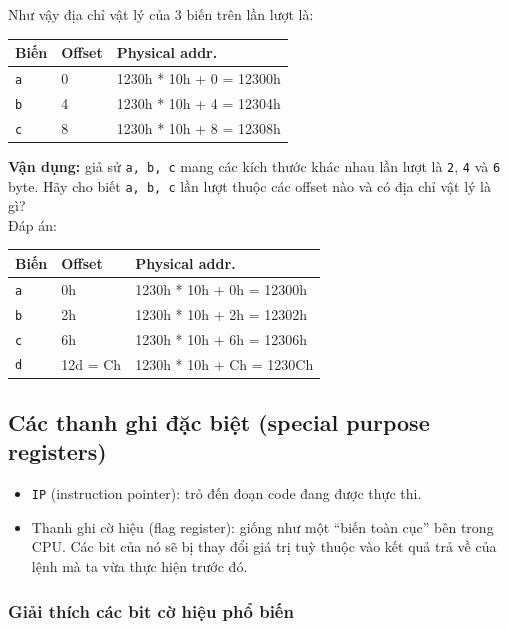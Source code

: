 \documentclass[12pt]{report}
\newcommand{\code}[1]{\texttt{#1}}
\begin{document}
Như vậy địa chỉ vật lý của 3 biến trên lần lượt là:
\begin{table}[H]
    \centering
    \begin{tabular}{|l|l|l|}
    \hline
    Biến        & Offset    & Physical addr.          \\
    \hline
    \code{a}    & 0         & 1230h * 10h + 0 = 12300h \\
    \code{b}    & 4         & 1230h * 10h + 4 = 12304h \\
    \code{c}    & 8         & 1230h * 10h + 8 = 12308h \\
    \hline
    \end{tabular}
\end{table}

\textbf{Vận dụng:} giả sử \code{a, b, c} mang các kích thước khác nhau lần lượt là \code{2}, \code 4 và \code 6 byte. Hãy cho biết \code{a, b, c} lần lượt thuộc các offset nào và có địa chỉ vật lý là gì? \\
Đáp án:
\begin{table}[H]
    \centering
    \begin{tabular}{|l|l|l|}
    \hline
    Biến        & Offset    & Physical addr.          \\
    \hline
    \code{a}    & 0h         & 1230h * 10h + 0h = 12300h \\
    \code{b}    & 2h         & 1230h * 10h + 2h = 12302h \\
    \code{c}    & 6h         & 1230h * 10h + 6h = 12306h \\
    \code{d}    & 12d = Ch   & 1230h * 10h + Ch = 1230Ch \\
    \hline
    \end{tabular}
\end{table}

\subsection{Các thanh ghi đặc biệt (special purpose registers)}
\begin{itemize}
    \item \code{IP} (instruction pointer): trỏ đến đoạn code đang được thực thi.
    \item Thanh ghi cờ hiệu (flag register): giống như một ``biến toàn cục'' bên trong CPU. Các bit của nó sẽ bị thay đổi giá trị tuỳ thuộc vào kết quả trả về của lệnh mà ta vừa thực hiện trước đó.
\end{itemize}

\subsubsection{Giải thích các bit cờ hiệu phổ biến}
\end{document}
